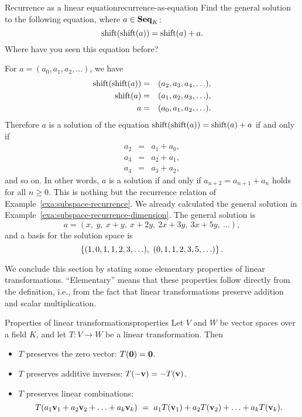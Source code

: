 \begin{example}{Recurrence as a linear equation}{recurrence-as-equation}
  Find the general solution to the following equation, where
  $a\in\mathbf{Seq}_K$:
  \begin{equation*}
    \shift(\shift(a)) = \shift(a) + a.
  \end{equation*}
  Where have you seen this equation before?
\end{example}

\begin{solution}
  For $a=(a_0,a_1,a_2,\ldots)$, we have
  \begin{eqnarray*}
    \shift(\shift(a)) &=& (a_2,a_3,a_4,\ldots), \\
    \shift(a) &=& (a_1,a_2,a_3,\ldots), \\
    a &=& (a_0,a_1,a_2,\ldots).
  \end{eqnarray*}
  Therefore $a$ is a solution of the equation $\shift(\shift(a)) =
  \shift(a) + a$ if and only if
  \begin{eqnarray*}
    a_2 &=& a_1 + a_0, \\
    a_3 &=& a_2 + a_1, \\
    a_4 &=& a_3 + a_2,
  \end{eqnarray*}
  and so on. In other words, $a$ is a solution if and only if
  $a_{n+2} = a_{n+1} + a_n$ holds for all $n\geq 0$. This is nothing
  but the recurrence relation of
  Example~\ref{exa:subspace-recurrence}. We already calculated the
  general solution in
  Example~{\ref{exa:subspace-recurrence-dimension}}. The general
  solution is
  \begin{equation*}
    a = (x,~y,~x+y,~x+2y,~2x+3y,~3x+5y,~\ldots),
  \end{equation*}
  and a basis for the solution space is
  \begin{equation*}
    \left\{(1,0,1,1,2,3,\ldots),~ (0,1,1,2,3,5,\ldots)\right\}.
  \end{equation*}
\end{solution}

We conclude this section by stating some elementary properties of
linear transformations. ``Elementary'' means that these properties
follow directly from the definition, i.e., from the fact that linear
transformations preserve addition and scalar multiplication.

\begin{theorem}{Properties of linear transformations}{properties}
  Let $V$ and $W$ be vector spaces over a field $K$, and let
  $T:V \to W$ be a linear transformation.  Then
  \begin{itemize}
  \item $T$ preserves the zero vector:
    $T(\mbox{\bf 0})=\mbox{\bf 0}$.
  \item $T$ preserves additive inverses:
    $T(-\mbox{\bf v})= -T(\mbox{\bf v})$.
  \item $T$ preserves linear combinations:
    \begin{equation*}
      T(a_1\mbox{\bf v}_1 + a_2\mbox{\bf v}_2 + \ldots + a_k\mbox{\bf v}_k)
      ~=~
      a_1T(\mbox{\bf v}_1) + a_2T(\mbox{\bf v}_2) + \ldots + a_kT(\mbox{\bf v}_k).
    \end{equation*}
  \end{itemize}
\end{theorem}

